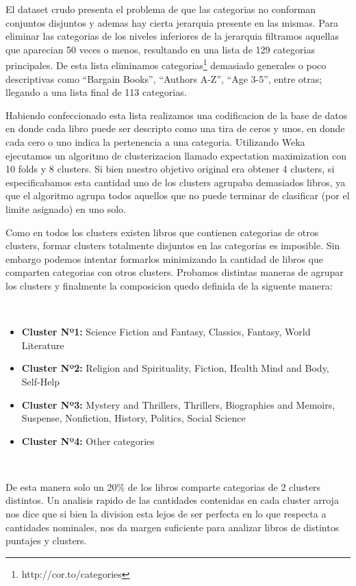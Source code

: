 \documentclass[12pt,journal,compsoc]{IEEEtran}
\begin{document}
El dataset crudo presenta el problema de que las categorias no conforman conjuntos disjuntos y ademas hay cierta jerarquia presente en las mismas. Para eliminar las categorias de los niveles inferiores de la jerarquia filtramos aquellas que aparecian 50 veces o menos, resultando en una lista de 129 categorias principales. De esta lista eliminamos categorias\footnote{http://cor.to/categories} demasiado generales o poco descriptivas como ``Bargain Books'', ``Authors A-Z'', ``Age 3-5'', entre otras; llegando a una lista final de 113 categorias.


Habiendo confeccionado esta lista realizamos una codificacion de la base de datos en donde cada libro puede ser descripto como una tira de ceros y unos, en donde cada cero o uno indica la pertenencia a una categoria. Utilizando Weka ejecutamos un algoritmo de clusterizacion llamado expectation maximization con 10 folds y 8 clusters. Si bien nuestro objetivo original era obtener 4 clusters, si especificabamos esta cantidad uno de los clusters agrupaba demasiados libros, ya que el algoritmo agrupa todos aquellos que no puede terminar de clasificar (por el limite asignado) en uno solo.

Como en todos los clusters existen libros que contienen categorias de otros clusters, formar clusters totalmente disjuntos en las categorias es imposible. Sin embargo podemos intentar formarlos minimizando la cantidad de libros que comparten categorias con otros clusters. Probamos distintas maneras de agrupar los clusters y finalmente la composicion quedo definida de la siguente manera:

~

\begin{itemize}
\item \textbf{Cluster Nº1:} Science Fiction and Fantasy, Classics, Fantasy, World Literature
\item \textbf{Cluster Nº2:} Religion and Spirituality, Fiction, Health Mind and Body, Self-Help
\item \textbf{Cluster Nº3:} Mystery and Thrillers, Thrillers, Biographies and Memoirs, Suspense, Nonfiction, History, Politics, Social Science
\item \textbf{Cluster Nº4:} Other categories
\end{itemize}

~

De esta manera solo un 20\% de los libros comparte categorias de 2 clusters distintos. Un analisis rapido de las cantidades contenidas en cada cluster arroja nos dice que si bien la division esta lejos de ser perfecta en lo que respecta a cantidades nominales, nos da margen suficiente para analizar libros de distintos puntajes y clusters.
\end{document}
